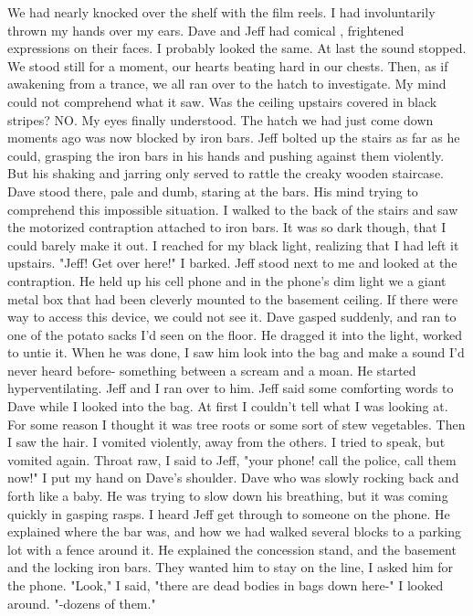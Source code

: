 \documentclass[a4paper]{article}
\begin{document}
We had nearly knocked over the shelf with the film reels. I had involuntarily thrown my hands over my ears. Dave and Jeff had comical , frightened expressions on their faces. I probably looked the same.
At last the sound stopped. We stood still for a moment, our hearts beating hard in our chests.
Then, as if awakening from a trance, we all ran over to the hatch to investigate. My mind could not comprehend what it saw. Was the ceiling upstairs covered in black stripes?
NO. My eyes finally understood. The hatch we had just come down moments ago was now blocked by iron bars.
Jeff bolted up the stairs as far as he could, grasping the iron bars in his hands and pushing against them violently. But his shaking and jarring only served to rattle the creaky wooden staircase.
Dave stood there, pale and dumb, staring at the bars. His mind trying to comprehend this impossible situation.
I walked to the back of the stairs and saw the motorized contraption attached to iron bars. It was so dark though, that I could barely make it out.
I reached for my black light, realizing that I had left it upstairs. "Jeff! Get over here!" I barked.
Jeff stood next to me and looked at the contraption. He held up his cell phone and in the phone's dim light we a giant metal box that had been cleverly mounted to the basement ceiling. If there were way to access this device, we could not see it.
Dave gasped suddenly, and ran to one of the potato sacks I'd seen on the floor. He dragged it into the light, worked to untie it. When he was done, I saw him look into the bag and make a sound I'd never heard before- something between a scream and a moan. He started hyperventilating.
Jeff and I ran over to him. Jeff said some comforting words to Dave while I looked into the bag.
At first I couldn't tell what I was looking at. For some reason I thought it was tree roots or some sort of stew vegetables. Then I saw the hair.
I vomited violently, away from the others.
I tried to speak, but vomited again. Throat raw, I said to Jeff, "your phone! call the police, call them now!"
I put my hand on Dave's shoulder. Dave who was slowly rocking back and forth like a baby. He was trying to slow down his breathing, but it was coming quickly in gasping rasps.
I heard Jeff get through to someone on the phone. He explained where the bar was, and how we had walked several blocks to a parking lot with a fence around it. He explained the concession stand, and the basement and the locking iron bars.
They wanted him to stay on the line, I asked him for the phone.
"Look," I said, "there are dead bodies in bags down here-" I looked around. "-dozens of them."
\end{document}

